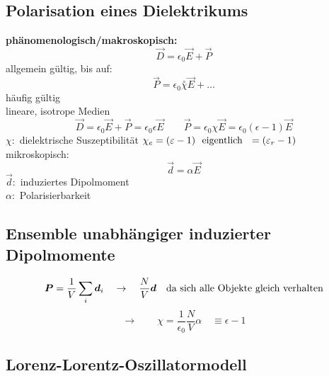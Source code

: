 \subsection{Polarisation eines Dielektrikums}

\textbf{phänomenologisch/makroskopisch:}
\begin{equation*}
\vec{D} = \epsilon_0 \vec{E} + \vec{P}
\end{equation*}
allgemein gültig, bis auf:
\begin{equation*}
\vec{P} = \epsilon_0 \overset{\circ}{\chi} \vec{E} + \dots
\end{equation*}
häufig gültig\\[5pt]
lineare, isotrope Medien
\begin{equation*}
\vec{D} = \epsilon_0 \vec{E} + \vec{P} = \epsilon_0 \epsilon \vec{E} \qquad \vec{P} = \epsilon_0 \chi \vec{E} = \epsilon_0 (\epsilon - 1) \vec{E}
\end{equation*}
$ \chi : $ dielektrische Suszeptibilität $ \chi_e = (\varepsilon - 1) \ \textrm{ eigentlich } \ = (\varepsilon_r - 1) $\\[5pt]
mikroskopisch:
\begin{equation*}
\vec{d} = \alpha \vec{E}
\end{equation*}
$ \vec{d} : $ induziertes Dipolmoment\\
$ \alpha : $ Polarisierbarkeit

\subsection{Ensemble unabhängiger induzierter Dipolmomente}

\begin{equation*}
\boldsymbol{P} = \frac{1}{V} \sum_i \boldsymbol{d}_i \quad \rightarrow \quad \frac{N}{V} \boldsymbol{d} \quad \textrm{da sich alle Objekte gleich verhalten}
\end{equation*}
\begin{equation*}
\rightarrow \qquad \chi = \frac{1}{\epsilon_0} \frac{N}{V} \alpha \quad \equiv \epsilon - 1
\end{equation*}

\subsection{Lorenz-Lorentz-Oszillatormodell}


